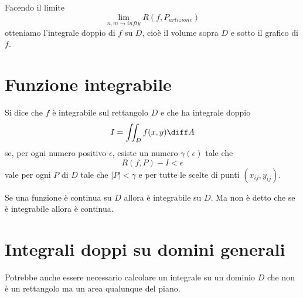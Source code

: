Facendo il limite 
$$\lim_{n,m \to infty} R(f,P_{artizione})$$ otteniamo l'integrale doppio di $f$ su $D$, cioè il volume sopra $D$ e sotto il grafico di $f$.


\section{Funzione integrabile}

\begin{definition}
Si dice che $f$ è integrabile sul rettangolo $D$ e che ha integrale doppio $$I = \iint_D f(x,y) \diff A$$
se, per ogni numero positivo $\epsilon$, esiste un numero $\gamma(\epsilon)$ tale  che $$R(f,P)-I<\epsilon$$ vale per ogni $P$ di $D$ tale che $|P|<\gamma$ e per tutte le scelte di punti $(x_{ij},y_{ij})$. 
\end{definition}

\begin{property}
Se una funzione è continua su $D$ allora è integrabile su $D$. Ma non è detto che se è integrabile allora è continua.
\end{property}

\section{Integrali doppi su domini generali}

Potrebbe anche essere necessario calcolare un integrale su un dominio $D$ che non è un rettangolo ma un area qualunque del piano. 

